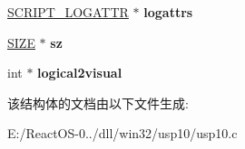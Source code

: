 \begin{DoxyCompactItemize}
\item 
\mbox{\label{struct_string_analysis_abe6134e44c5b1da9184e3002a0fde13f}} 
\hyperlink{structtag___s_c_r_i_p_t___l_o_g_a_t_t_r}{S\+C\+R\+I\+P\+T\+\_\+\+L\+O\+G\+A\+T\+TR} $\ast$ {\bfseries logattrs}
\item 
\mbox{\label{struct_string_analysis_a319ef9068d12bb2aa05cce5f4662b3e6}} 
\hyperlink{structtag_s_i_z_e}{S\+I\+ZE} $\ast$ {\bfseries sz}
\item 
\mbox{\label{struct_string_analysis_a57940c469c0365d82126a0a28d50a679}} 
int $\ast$ {\bfseries logical2visual}
\end{DoxyCompactItemize}


该结构体的文档由以下文件生成\+:\begin{DoxyCompactItemize}
\item 
E\+:/\+React\+O\+S-\/0../dll/win32/usp10/usp10.\+c\end{DoxyCompactItemize}
